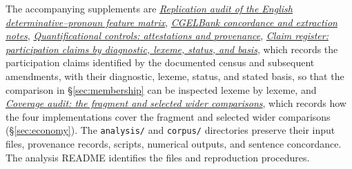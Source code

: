 \documentclass[12pt]{article}
\begin{document}
The accompanying supplements are \href{run:matrix-audit.pdf}{\textit{Replication audit of the English determinative--pronoun feature matrix}}, \href{run:corpus-documentation.pdf}{\textit{CGELBank concordance and extraction notes}}, \href{run:quantifier-controls.pdf}{\textit{Quantificational controls: attestations and provenance}}, \href{run:claim-register.pdf}{\textit{Claim register: participation claims by diagnostic, lexeme, status, and basis}}, which records the participation claims identified by the documented census and subsequent amendments, with their diagnostic, lexeme, status, and stated basis, so that the comparison in §\ref{sec:membership} can be inspected lexeme by lexeme, and \href{run:coverage-audit.pdf}{\textit{Coverage audit: the fragment and selected wider comparisons}}, which records how the four implementations cover the fragment and selected wider comparisons (§\ref{sec:economy}). The \texttt{analysis/} and \texttt{corpus/} directories preserve their input files, provenance records, scripts, numerical outputs, and sentence concordance. The analysis README identifies the files and reproduction procedures.

\clearpage
\printbibliography
\end{document}
